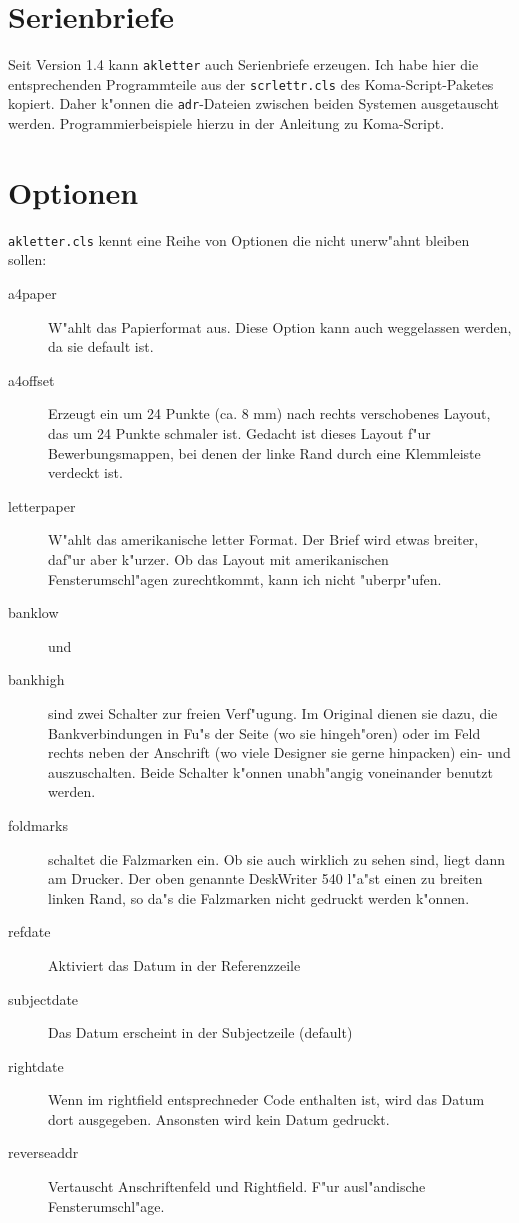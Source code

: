 \documentclass[a4paper]{article}
\begin{document}
\section{Serienbriefe}

Seit Version 1.4 kann \texttt{akletter} auch Serienbriefe 
erzeugen. Ich habe hier die entsprechenden Programmteile aus der 
\texttt{scrlettr.cls} des Koma-Script-Paketes kopiert. Daher 
k"onnen die \texttt{adr}-Dateien zwischen beiden Systemen 
ausgetauscht werden. Programmierbeispiele hierzu in der 
Anleitung zu Koma-Script.

\section{Optionen}

\texttt{akletter.cls} kennt eine Reihe von Optionen die nicht 
unerw"ahnt bleiben sollen:

\begin{description}
\item [a4paper] W"ahlt das Papierformat aus. Diese Option kann auch
weggelassen werden, da sie default ist.

\item [a4offset] Erzeugt ein um 24 Punkte (ca. 8 mm) nach rechts
verschobenes Layout, das um 24 Punkte schmaler ist. Gedacht ist dieses
Layout f"ur Bewerbungsmappen, bei denen der linke Rand durch eine
Klemmleiste verdeckt ist.

\item[letterpaper] W"ahlt das amerikanische letter Format. Der Brief
wird etwas breiter, daf"ur aber k"urzer. Ob das Layout mit
amerikanischen Fensterumschl"agen zurechtkommt, kann ich nicht
"uberpr"ufen.

\item [banklow] und

\item [bankhigh] sind zwei Schalter zur freien Verf"ugung. Im Original
dienen sie dazu, die Bankverbindungen in Fu"s der Seite (wo sie
hingeh"oren) oder im Feld rechts neben der Anschrift (wo viele
Designer sie gerne hinpacken) ein- und auszuschalten. Beide Schalter
k"onnen unabh"angig voneinander benutzt werden.

\item [foldmarks] schaltet die Falzmarken ein. Ob sie auch wirklich zu
sehen sind, liegt dann am Drucker. Der oben genannte DeskWriter 540
l"a"st einen zu breiten linken Rand, so da"s die Falzmarken nicht
gedruckt werden k"onnen.

\item [refdate] Aktiviert das Datum in der Referenzzeile


\item [subjectdate] Das Datum erscheint in der Subjectzeile (default)

\item [rightdate] Wenn im rightfield entsprechneder Code enthalten
ist, wird das Datum dort ausgegeben. Ansonsten wird kein Datum
gedruckt.
\item [reverseaddr] Vertauscht Anschriftenfeld und Rightfield. F"ur
	ausl"andische Fensterumschl"age.
\end{description}
\end{document}
